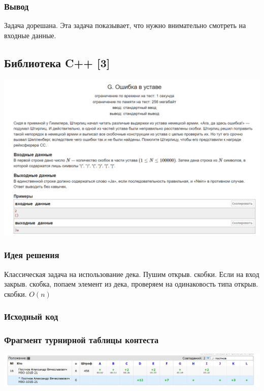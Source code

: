 \subsubsection*{Вывод}
Задача дорешана. Эта задача показывает, что нужно внимательно смотреть на входные данные.

\vspace{20pt}

\pagebreak

\subsection*{Библиотека C++ [3]}
\begin{center}
\includegraphics[width=\textwidth]{statements/3.png}
\end{center}
\subsubsection*{Идея решения}
Классическая задача на использование дека. Пушим открыв. скобки. Если на вход закрыв. скобка, попаем элемент из дека, проверяем на одинаковость типа открыв. скобки. $O(n)$

\subsubsection*{Исходный код}


\subsubsection*{Фрагмент турнирной таблицы контеста}
\begin{center}
\includegraphics[width=\textwidth]{standings/3.png}\newline\noindent
\end{center}

